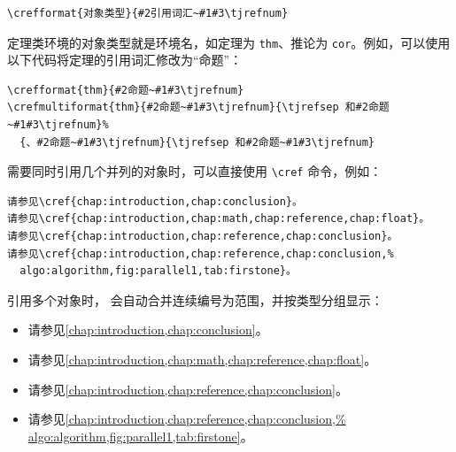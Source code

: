 \begin{Verbatim}
\crefformat{对象类型}{#2引用词汇~#1#3\tjrefnum}
\end{Verbatim}

定理类环境的对象类型就是环境名，如定理为 \texttt{thm}、推论为 \texttt{cor}。例如，可以使用以下代码将定理的引用词汇修改为“命题”：
\begin{Verbatim}
\crefformat{thm}{#2命题~#1#3\tjrefnum}
\crefmultiformat{thm}{#2命题~#1#3\tjrefnum}{\tjrefsep 和#2命题~#1#3\tjrefnum}%
  {、#2命题~#1#3\tjrefnum}{\tjrefsep 和#2命题~#1#3\tjrefnum}
\end{Verbatim}

需要同时引用几个并列的对象时，可以直接使用 \verb|\cref| 命令，例如：
\begin{Verbatim}
请参见\cref{chap:introduction,chap:conclusion}。
请参见\cref{chap:introduction,chap:math,chap:reference,chap:float}。
请参见\cref{chap:introduction,chap:reference,chap:conclusion}。
请参见\cref{chap:introduction,chap:reference,chap:conclusion,%
  algo:algorithm,fig:parallel1,tab:firstone}。
\end{Verbatim}

引用多个对象时， 会自动合并连续编号为范围，并按类型分组显示：
\begin{itemize}
  \item 请参见\cref{chap:introduction,chap:conclusion}。
  \item 请参见\cref{chap:introduction,chap:math,chap:reference,chap:float}。
  \item 请参见\cref{chap:introduction,chap:reference,chap:conclusion}。
  \item 请参见\cref{chap:introduction,chap:reference,chap:conclusion,%
        algo:algorithm,fig:parallel1,tab:firstone}。
\end{itemize}
